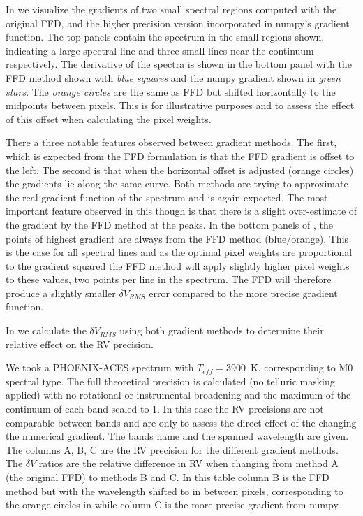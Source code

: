 

In  we visualize the gradients of two small spectral regions computed with the original FFD, and the higher precision version incorporated in numpy's gradient function. The top panels contain the spectrum in the small regions shown, indicating a large spectral line and three small lines near the continuum respectively. The derivative of the spectra is shown in the bottom panel with the FFD method shown with \emph{blue squares} and the numpy gradient shown in \emph{green stars}. The \emph{orange circles} are the same as FFD but shifted horizontally to the midpoints between  pixels. This is for illustrative purposes and to assess the effect of this offset when calculating the pixel weights.

There a three notable features observed between gradient methods. The first, which is expected from the FFD formulation is that the FFD gradient is offset to the left. The second is that when the horizontal offset is adjusted (orange circles) the gradients lie along the same curve. Both methods are trying to approximate the real gradient function of the spectrum and is again expected.
The most important feature observed in this though is that there is a slight over-estimate of the gradient by the FFD method at the peaks. In the bottom panels of , the points of highest gradient are always from the FFD method (blue/orange). This is the case for all spectral lines and as the optimal pixel weights are proportional to the gradient squared the FFD method will apply slightly higher pixel weights to these values, two points per line in the spectrum. The FFD will therefore produce a slightly smaller \(\delta V_{RMS}\) error compared to the more precise gradient function.

In  we calculate the  \(\delta V_{RMS}\) using both gradient methods to determine their relative effect on the RV precision.

We took a PHOENIX-ACES spectrum with \(T_{eff}=3900\)~K, corresponding to M0 spectral type. The full theoretical precision is calculated (no telluric masking applied) with no rotational or instrumental broadening and the maximum of the continuum of each band scaled to 1. In this case the RV precisions are not comparable between bands and are only to assess the direct effect of the changing the numerical gradient. The bands name and the spanned wavelength are given. The columns A, B, C are the RV precision for the different gradient methods. The \(\delta V\) ratios are the relative difference in RV when changing from method A (the original FFD) to methods B and C. In this table column B is the FFD method but with the wavelength shifted to in between pixels, corresponding to the orange circles in  while column C is the more precise gradient from numpy.

